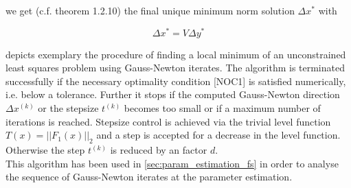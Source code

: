 \documentclass{scrartcl}[12pt, halfparskip]
\numberwithin{equation}{section}
\numberwithin{figure}{section}
\numberwithin{table}{section}
\begin{document}
\begin{itemize}
	we get (c.f. \cite{numerical_methods_lsq_Bjorck} theorem 1.2.10) the final unique minimum norm solution  $\Delta x^*$ with
	
	\begin{equation}
		\Delta x^* = V \Delta y^*
	\end{equation}


\end{itemize}

\vspace{0.5cm}
 depicts exemplary the procedure of finding a local minimum of an unconstrained least squares problem using Gauss-Newton iterates. The algorithm is terminated successfully if the necessary optimality condition [NOC1] is satisfied numerically, i.e. below a tolerance. Further it stops if the computed Gauss-Newton direction $\Delta x^{(k)}$ or the stepsize $t^{(k)}$ becomes too small or if a maximum number of iterations is reached. Stepsize control is achieved via the trivial level function $T(x) = ||F_1(x)||_2$ and a step is accepted for a decrease in the level function. Otherwise the step $t^{(k)}$ is reduced by an factor $d$. \\
This algorithm has been used in \cref{sec:param_estimation_fs} in order to analyse the sequence of Gauss-Newton iterates at the parameter estimation.  \\
\end{document}
